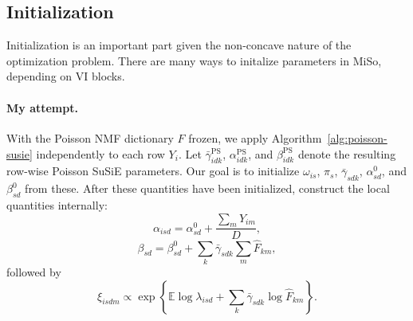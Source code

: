 \documentclass[11pt]{article}
\theoremstyle{plain}
\theoremstyle{definition}
\begin{document}
\subsection{Initialization}
Initialization is an important part given the non-concave nature of the optimization problem. There are many ways to initalize parameters in MiSo, depending on VI blocks. 
\paragraph{My attempt.}
With the Poisson NMF dictionary $\widehat F$ frozen, we apply
Algorithm~\ref{alg:poisson-susie} independently to each row $Y_i$. Let
$\bar\gamma^{\mathrm{PS}}_{idk}$, $\alpha^{\mathrm{PS}}_{idk}$, and
$\beta^{\mathrm{PS}}_{idk}$ denote the resulting row-wise Poisson SuSiE
parameters. Our goal is to initialize $\omega_{is}$, $\pi_s$,
$\bar\gamma_{sdk}$, $\alpha^0_{sd}$, and $\beta^0_{sd}$ from these. After
these quantities have been initialized, construct the local quantities
internally:
\[
\alpha_{isd}
=
\alpha^{0}_{sd}+\frac{\sum_mY_{im}}{D},
\]
\[
\beta_{sd}
=
\beta^{0}_{sd}
+
\sum_k\bar\gamma_{sdk}\sum_m \widehat F_{km},
\]
followed by
\[
\xi_{isdm}
\propto
\exp\left\{
\mathbb E\log\lambda_{isd}
+
\sum_k\bar\gamma_{sdk}\log \widehat F_{km}
\right\}.
\]
\end{document}
